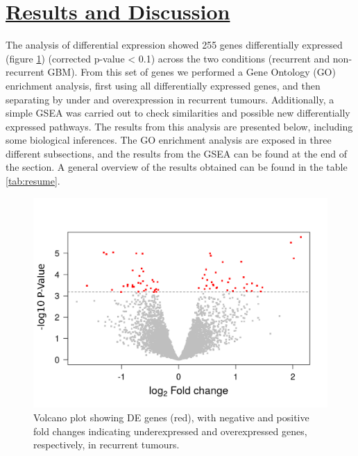 \documentclass[9pt,twocolumn,twoside]{gsajnl}
\begin{document}
\section*{\underline{Results and Discussion}}

The analysis of differential expression showed 255 genes differentially expressed (figure \ref{fig:volcano}) (corrected p-value < 0.1) across the two conditions (recurrent and non-recurrent GBM). From this set of genes we performed a Gene Ontology (GO) enrichment analysis, first using all differentially expressed genes, and then separating by under and overexpression in recurrent tumours. Additionally, a simple GSEA was carried out to check similarities and possible new differentially expressed pathways. The results from this analysis are presented below, including some biological inferences. The GO enrichment analysis are exposed in three different subsections, and the results from the GSEA can be found at the end of the section. A general overview of the results obtained can be found in the table \ref{tab:resume}.

\begin{figure}[!h]
	\centering
	\includegraphics[scale=0.4]{volcano.png}
	\caption{Volcano plot showing DE genes (red), with negative and positive fold changes indicating underexpressed and overexpressed genes, respectively, in recurrent tumours.}
	\label{fig:volcano}
\end{figure}
\end{document}
